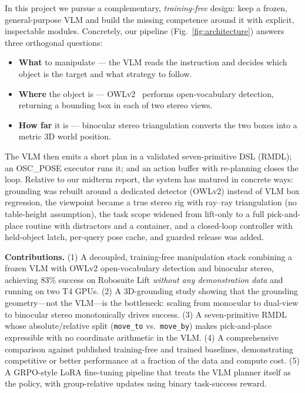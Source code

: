 \documentclass[conference]{IEEEtran}
\begin{document}
In this project we pursue a complementary, \emph{training-free} design: keep a frozen, general-purpose VLM and build the missing competence around it with explicit, inspectable modules. Concretely, our pipeline (Fig.~\ref{fig:architecture}) answers three orthogonal questions:

\begin{itemize}
    \item \textbf{What} to manipulate --- the VLM reads the instruction and decides which object is the target and what strategy to follow.
    \item \textbf{Where} the object is --- OWLv2~\cite{owlv2} performs open-vocabulary detection, returning a bounding box in each of two stereo views.
    \item \textbf{How far} it is --- binocular stereo triangulation converts the two boxes into a metric 3D world position.
\end{itemize}

The VLM then emits a short plan in a validated seven-primitive DSL (RMDL); an OSC\_POSE executor runs it; and an action buffer with re-planning closes the loop. Relative to our midterm report, the system has matured in concrete ways: grounding was rebuilt around a dedicated detector (OWLv2) instead of VLM box regression, the viewpoint became a true stereo rig with ray--ray triangulation (no table-height assumption), the task scope widened from lift-only to a full pick-and-place routine with distractors and a container, and a closed-loop controller with held-object latch, per-query pose cache, and guarded release was added.

\textbf{Contributions.} (1) A decoupled, training-free manipulation stack combining a frozen VLM with OWLv2 open-vocabulary detection and binocular stereo, achieving 83\% success on Robosuite Lift \emph{without any demonstration data} and running on two T4 GPUs. (2) A 3D-grounding study showing that the grounding geometry---not the VLM---is the bottleneck: scaling from monocular to dual-view to binocular stereo monotonically drives success. (3) A seven-primitive RMDL whose absolute/relative split (\texttt{move\_to} vs.\ \texttt{move\_by}) makes pick-and-place expressible with no coordinate arithmetic in the VLM. (4) A comprehensive comparison against published training-free and trained baselines, demonstrating competitive or better performance at a fraction of the data and compute cost. (5) A GRPO-style LoRA fine-tuning pipeline that treats the VLM planner itself as the policy, with group-relative updates using binary task-success reward.
\end{document}
